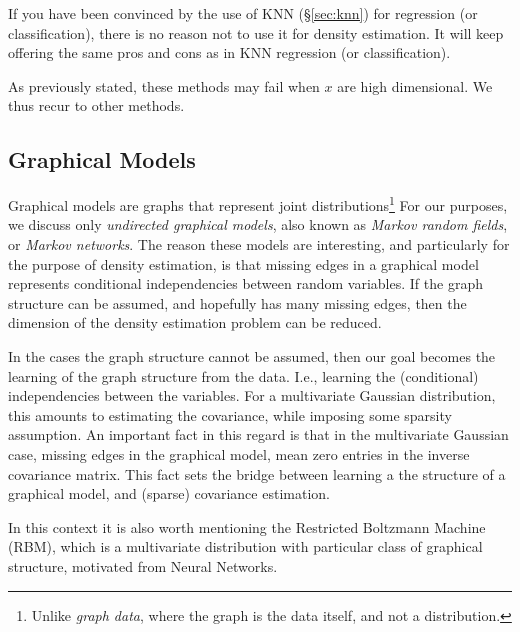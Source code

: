 \begin{remark}
If you have been convinced by the use of KNN (\S\ref{sec:knn}) for regression (or classification), there is no reason not to use it for density estimation. It will keep offering the same pros and cons as in KNN regression (or classification).
\end{remark}

As previously stated, these methods may fail when $x$ are high dimensional. We thus recur to other methods.



\subsection{Graphical Models}
\label{sec:graphical_models}

Graphical models are graphs that represent joint distributions\footnote{Unlike \emph{graph data}, where the graph is the data itself, and not a distribution.}
For our purposes, we discuss only \emph{undirected graphical models}, also known as \emph{Markov random fields}, or \emph{Markov networks}.
The reason these models are interesting, and particularly for the purpose of density estimation, is that missing edges in a graphical model represents conditional independencies between random variables. 
If the graph structure can be assumed, and hopefully has many missing edges, then the dimension of the density estimation problem can be reduced. 

In the cases the graph structure cannot be assumed, then our goal becomes the learning of the graph structure from the data. I.e., learning the (conditional) independencies between the variables. For a multivariate Gaussian distribution, this amounts to estimating the covariance, while imposing some sparsity assumption. 
An important fact in this regard is that in the multivariate Gaussian case, missing edges in the graphical model, mean zero entries in the inverse covariance matrix. This fact sets the bridge between learning a the structure of a graphical model, and (sparse) covariance estimation.

\begin{remark}
In this context it is also worth mentioning the Restricted Boltzmann Machine (RBM), which is a multivariate distribution with particular class of graphical structure, motivated from Neural Networks. 
\end{remark}



